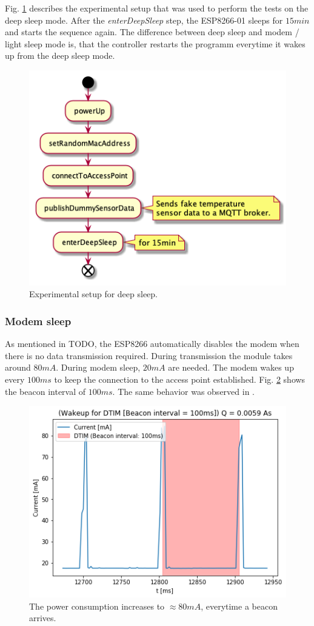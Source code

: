 Fig. \ref{fig:experiment_deep_sleep} describes the experimental setup that was used to perform the tests on the deep sleep mode.
After the \textit{enterDeepSleep} step, the ESP8266-01 sleeps for $15min$ and starts the sequence again.
The difference between deep sleep and modem / light sleep mode is, that the controller restarts the programm everytime it wakes up from the deep sleep mode.
\begin{figure}[h]
    \centering
    \includegraphics[width = 0.7 \linewidth]{fig/sequence_deep_sleep.png}
    \caption{Experimental setup for deep sleep.}
    \label{fig:experiment_deep_sleep}
\end{figure}

\subsubsection{Modem sleep}
As mentioned in TODO, the ESP8266 automatically disables the modem when there is no data transmission required.
During transmission the module takes around $80mA$. During modem sleep, $20mA$ are needed.
The modem wakes up every $100ms$ to keep the connection to the access point established.
Fig. \ref{fig:beacon_interval} shows the beacon interval of $100ms$. 
The same behavior was observed in \cite{montori_is_2017}.

\begin{figure}[h]
    \includegraphics[width = \linewidth]{fig/beacon_interval.png}
    \caption{The power consumption increases to $\approx 80mA$, everytime a beacon arrives.}
    \label{fig:beacon_interval}
\end{figure}

